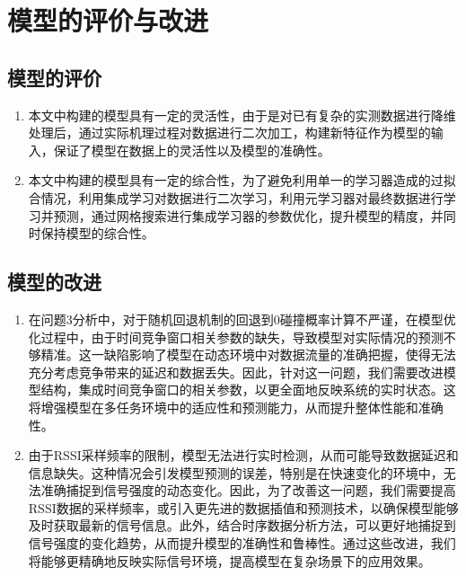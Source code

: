\documentclass[bwprint]{gmcmthesis}
\begin{document}
\pagestyle{plain}

\maketoc

\clearpage












\section{模型的评价与改进}
\subsection{模型的评价}

\begin{enumerate}
	\item 本文中构建的模型具有一定的灵活性，由于是对已有复杂的实测数据进行降维处理后，通过实际机理过程对数据进行二次加工，构建新特征作为模型的输入，保证了模型在数据上的灵活性以及模型的准确性。
	\item 本文中构建的模型具有一定的综合性，为了避免利用单一的学习器造成的过拟合情况，利用集成学习对数据进行二次学习，利用元学习器对最终数据进行学习并预测，通过网格搜索进行集成学习器的参数优化，提升模型的精度，并同时保持模型的综合性。
\end{enumerate}

\subsection{模型的改进}

\begin{enumerate}
	\item 在问题3分析中，对于随机回退机制的回退到0碰撞概率计算不严谨，在模型优化过程中，由于时间竞争窗口相关参数的缺失，导致模型对实际情况的预测不够精准。这一缺陷影响了模型在动态环境中对数据流量的准确把握，使得无法充分考虑竞争带来的延迟和数据丢失。因此，针对这一问题，我们需要改进模型结构，集成时间竞争窗口的相关参数，以更全面地反映系统的实时状态。这将增强模型在多任务环境中的适应性和预测能力，从而提升整体性能和准确性。
	
	\item 由于RSSI采样频率的限制，模型无法进行实时检测，从而可能导致数据延迟和信息缺失。这种情况会引发模型预测的误差，特别是在快速变化的环境中，无法准确捕捉到信号强度的动态变化。因此，为了改善这一问题，我们需要提高RSSI数据的采样频率，或引入更先进的数据插值和预测技术，以确保模型能够及时获取最新的信号信息。此外，结合时序数据分析方法，可以更好地捕捉到信号强度的变化趋势，从而提升模型的准确性和鲁棒性。通过这些改进，我们将能够更精确地反映实际信号环境，提高模型在复杂场景下的应用效果。
\end{enumerate}
\end{document}
